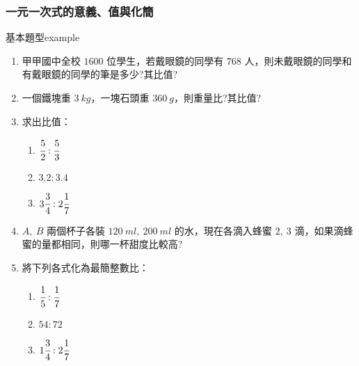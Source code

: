 \documentclass[bwprint,a4paper]{extarticle}
\begin{document}
\subsubsection{一元一次式的意義、值與化簡}
\begin{question}{基本題型}{example}
	\begin{enumerate}
		\item 甲甲國中全校 $1600$ 位學生，若戴眼鏡的同學有 $768$ 人，則未戴眼鏡的同學和有戴眼鏡的同學的筆是多少?其比值?
		\item 一個鐵塊重 $3\ kg$，一塊石頭重 $360\ g$，則重量比?其比值?
		\item 求出比值：
		\begin{enumerate}[label=(\arabic*)]
			\item $\cfrac52:\cfrac53$
			\item $3.2:3.4$
			\item $3\cfrac34:2\cfrac17$
		\end{enumerate}
		\item $A,\ B$ 兩個杯子各裝 $120\ ml,\ 200\ ml$ 的水，現在各滴入蜂蜜 $2,\ 3$ 滴，如果滴蜂蜜的量都相同，則哪一杯甜度比較高?
		\item 將下列各式化為最簡整數比：
		\begin{enumerate}[label=(\arabic*)]
			\item $\cfrac15:\cfrac17$
			\item $54:72$
			\item $1\cfrac34:2\cfrac17$
		\end{enumerate}
	\end{enumerate}
\end{question}
\end{document}
